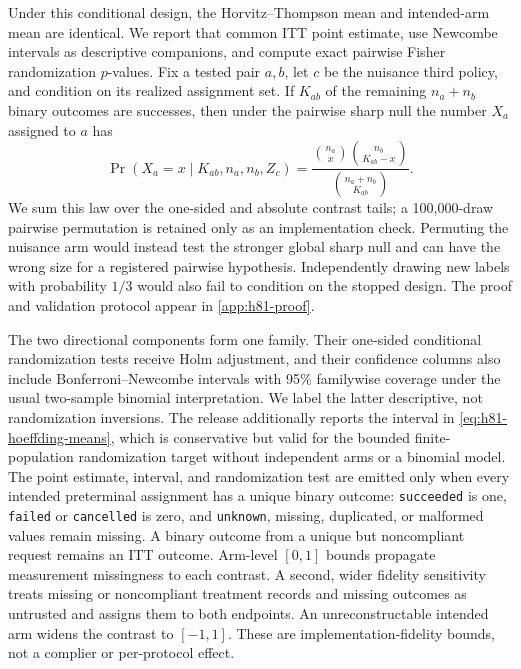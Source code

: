 \documentclass[11pt]{article}
\newcommand{\1}{\mathbf{1}}
\begin{document}
Under this conditional design, the Horvitz--Thompson mean and intended-arm mean
are identical.  We report that common ITT point estimate, use Newcombe intervals as
descriptive companions, and compute exact pairwise Fisher randomization
$p$-values.  Fix a tested pair $a,b$, let $c$ be the nuisance third policy, and
condition on its realized assignment set.  If $K_{ab}$ of the remaining
$n_a+n_b$ binary outcomes are successes, then under the pairwise sharp null the
number $X_a$ assigned to $a$ has
\begin{equation}
 \Pr(X_a=x\mid K_{ab},n_a,n_b,Z_c)=
 \frac{\binom{n_a}{x}\binom{n_b}{K_{ab}-x}}
 {\binom{n_a+n_b}{K_{ab}}}.
 \label{eq:h81-exact-randomization}
\end{equation}
We sum this law over the one-sided and absolute contrast tails; a 100,000-draw
pairwise permutation is retained only as an implementation check.  Permuting
the nuisance arm would instead test the stronger global sharp null and can have
the wrong size for a registered pairwise hypothesis.  Independently drawing new
labels with probability $1/3$ would also fail to condition on the stopped design.
The proof and validation protocol appear in \cref{app:h81-proof}.

The two directional components form one family.  Their one-sided conditional
randomization tests receive Holm adjustment, and their confidence columns also
include Bonferroni--Newcombe intervals with 95\% familywise coverage under the
usual two-sample binomial interpretation.  We label the latter descriptive,
not randomization inversions.  The release additionally reports the interval in
\cref{eq:h81-hoeffding-means}, which is conservative but valid for the bounded
finite-population randomization target without independent arms or a binomial
model.  The point estimate, interval, and randomization
test are emitted only when every intended preterminal assignment has a unique
binary outcome:
\texttt{succeeded} is one, \texttt{failed} or \texttt{cancelled} is zero, and
\texttt{unknown}, missing, duplicated, or malformed values remain missing.  A
binary outcome from a unique but noncompliant request remains an ITT outcome.
Arm-level $[0,1]$ bounds propagate measurement missingness to each contrast.  A
second, wider fidelity sensitivity treats missing or noncompliant treatment
records and missing outcomes as untrusted and assigns them to both endpoints.
An unreconstructable intended arm widens the contrast to $[-1,1]$.  These are
implementation-fidelity bounds, not a complier or per-protocol effect.
\end{document}
